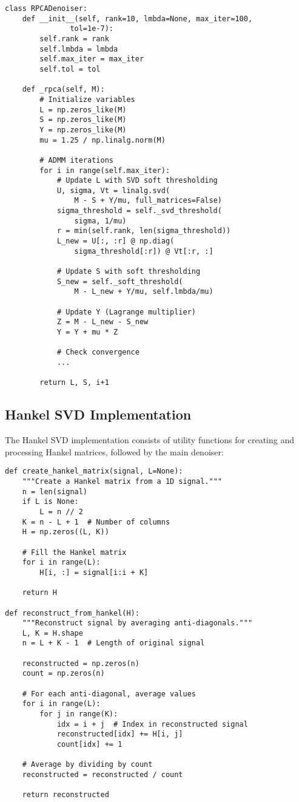 \documentclass[10pt,twocolumn]{article}
\begin{document}
\begin{lstlisting}
class RPCADenoiser:
    def __init__(self, rank=10, lmbda=None, max_iter=100, 
               tol=1e-7):
        self.rank = rank
        self.lmbda = lmbda
        self.max_iter = max_iter
        self.tol = tol
    
    def _rpca(self, M):
        # Initialize variables
        L = np.zeros_like(M)
        S = np.zeros_like(M)
        Y = np.zeros_like(M)
        mu = 1.25 / np.linalg.norm(M)
        
        # ADMM iterations
        for i in range(self.max_iter):
            # Update L with SVD soft thresholding
            U, sigma, Vt = linalg.svd(
                M - S + Y/mu, full_matrices=False)
            sigma_threshold = self._svd_threshold(
                sigma, 1/mu)
            r = min(self.rank, len(sigma_threshold))
            L_new = U[:, :r] @ np.diag(
                sigma_threshold[:r]) @ Vt[:r, :]
            
            # Update S with soft thresholding
            S_new = self._soft_threshold(
                M - L_new + Y/mu, self.lmbda/mu)
            
            # Update Y (Lagrange multiplier)
            Z = M - L_new - S_new
            Y = Y + mu * Z
            
            # Check convergence
            ...
            
        return L, S, i+1
\end{lstlisting}

\subsection{Hankel SVD Implementation}
The Hankel SVD implementation consists of utility functions for creating and processing Hankel matrices, followed by the main denoiser:

\begin{lstlisting}
def create_hankel_matrix(signal, L=None):
    """Create a Hankel matrix from a 1D signal."""
    n = len(signal)
    if L is None:
        L = n // 2
    K = n - L + 1  # Number of columns
    H = np.zeros((L, K))
    
    # Fill the Hankel matrix
    for i in range(L):
        H[i, :] = signal[i:i + K]
    
    return H

def reconstruct_from_hankel(H):
    """Reconstruct signal by averaging anti-diagonals."""
    L, K = H.shape
    n = L + K - 1  # Length of original signal
    
    reconstructed = np.zeros(n)
    count = np.zeros(n)
    
    # For each anti-diagonal, average values
    for i in range(L):
        for j in range(K):
            idx = i + j  # Index in reconstructed signal
            reconstructed[idx] += H[i, j]
            count[idx] += 1
    
    # Average by dividing by count
    reconstructed = reconstructed / count
    
    return reconstructed
\end{lstlisting}
\end{document}
